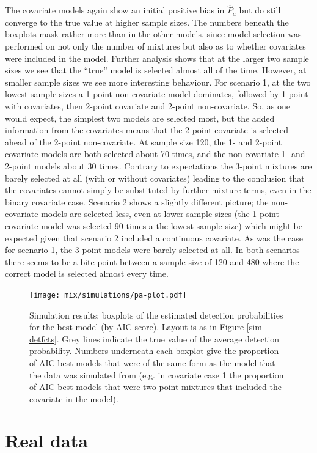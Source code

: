 The covariate models again show an initial positive bias in $\hat{P}_a$ but do still converge to the true value at higher sample sizes. The numbers beneath the boxplots mask rather more than in the other models, since model selection was performed on not only the number of mixtures but also as to whether covariates were included in the model. Further analysis shows that at the larger two sample sizes we see that the ``true'' model is selected almost all of the time. However,  at smaller sample sizes we see more interesting behaviour. For scenario 1, at the two lowest sample sizes a 1-point non-covariate model dominates, followed by 1-point with covariates, then 2-point covariate and 2-point non-covariate. So, as one would expect, the simplest two models are selected most, but the added information from the covariates means that the 2-point covariate is selected ahead of the 2-point non-covariate. At sample size 120, the 1- and 2-point covariate models are both selected about 70 times, and the non-covariate 1- and 2-point models about 30 times. Contrary to expectations the 3-point mixtures are barely selected at all (with or without covariates) leading to the conclusion that the covariates cannot simply be substituted by further mixture terms, even in the binary covariate case. Scenario 2 shows a slightly different picture; the non-covariate models are selected less, even at lower sample sizes (the 1-point covariate model was selected 90 times a the lowest sample size) which might be expected given that scenario 2 included a continuous covariate. As was the case for scenario 1, the 3-point models were barely selected at all. In both scenarios there seems to be a bite point between a sample size of 120 and 480 where the correct model is selected almost every time.
	

\begin{figure}
\centering
\texttt{[image: mix/simulations/pa-plot.pdf]}
\caption{Simulation results: boxplots of the estimated detection probabilities for the best model (by AIC score). Layout is as in Figure \ref{sim-detfcts}. Grey lines indicate the true value of the average detection probability. Numbers underneath each boxplot give the proportion of AIC best models that were of the same form as the model that the data was simulated from (e.g. in covariate case 1 the proportion of AIC best models that were two point mixtures that included the covariate in the model).}
\label{sim-boxplots}
\end{figure}


\section{Real data}
\label{s:data}

